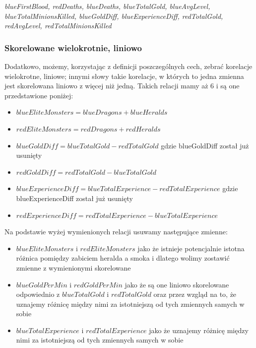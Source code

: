 \documentclass[twoside]{customStyle}
\begin{document}
\textit{blueFirstBlood, redDeaths, blueDeaths, blueTotalGold, blueAvgLevel, blueTotalMinionsKilled, blueGoldDiff, blueExperienceDiff, redTotalGold, redAvgLevel, redTotalMinionsKilled}

\begin{samepage}
\subsubsection{Skorelowane wielokrotnie, liniowo}
\indent \indent Dodatkowo, możemy, korzystając z definicji poszczególnych cech, zebrać korelacje wielokrotne, liniowe; innymi słowy takie korelacje, w których to jedna zmienna jest skorelowana liniowo z więcej niż jedną. Takich relacji mamy aż 6 i są one przedstawione poniżej:
\begin{itemize}
	\item $blueEliteMonsters = blueDragons + blueHeralds$
	\item $redEliteMonsters = redDragons + redHeralds$
	\item $blueGoldDiff = blueTotalGold - redTotalGold$ gdzie blueGoldDiff został już usunięty
	\item $redGoldDiff = redTotalGold - blueTotalGold$
	\item $blueExperienceDiff = blueTotalExperience - redTotalExperience$ gdzie blueExperienceDiff został już usunięty
	\item $redExperienceDiff = redTotalExperience - blueTotalExperience$
\end{itemize}
\end{samepage}
\begin{samepage}
\indent \indent Na podstawie wyżej wymienionych relacji usuwamy następujące zmienne:
\begin{itemize}
	\item $blueEliteMonsters$ i $redEliteMonsters$ jako że istnieje potencjalnie istotna różnica pomiędzy zabiciem heralda a smoka i dlatego wolimy zostawić zmienne z wymienionymi skorelowane
	\item $blueGoldPerMin$ i $redGoldPerMin$ jako że są one liniowo skorelowane odpowiednio z $blueTotalGold$ i $redTotalGold$ oraz przez wzgląd na to, że uznajemy różnicę między nimi za istotniejszą od tych zmiennych samych w sobie
	\item $blueTotalExperience$ i $redTotalExperience$ jako że uznajemy różnicę między nimi za istotniejszą od tych zmiennych samych w sobie
\end{itemize}
\end{samepage}
\newpage
\end{document}
